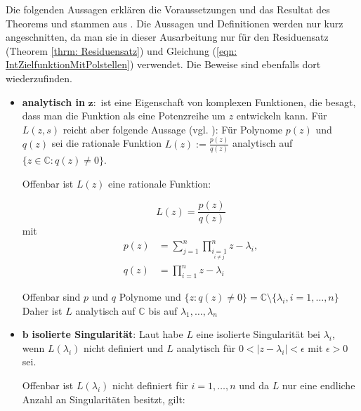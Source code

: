 \documentclass[a4paper,12pt]{report}
\newcommand{\C}{\mathbb C}
\newcommand{\1}{\mathds{1}}
\theoremstyle{plain} %
\theoremstyle{definition} %
\theoremstyle{remark}
\begin{document}
            Die folgenden Aussagen erklären die Voraussetzungen und das Resultat des Theorems und stammen aus \cite{complexAnalysis}.
            Die Aussagen und Definitionen werden nur kurz angeschnitten, da man sie in dieser Ausarbeitung nur für den Residuensatz (Theorem \ref{thrm: Residuensatz}) und Gleichung (\ref{eqn: IntZielfunktionMitPolstellen}) verwendet.
            Die Beweise sind ebenfalls dort wiederzufinden.
            \begin{itemize}
                  \item \textbf{analytisch in }$\mathbf{z:}$ ist eine Eigenschaft von komplexen Funktionen, die besagt, dass man die Funktion als eine Potenzreihe um $z$ entwickeln kann.
                        Für $L(z, s)$ reicht aber folgende Aussage (vgl. \cite[S. 24]{complexAnalysis}):
                        Für Polynome $p(z)$ und $q(z)$ sei die rationale Funktion $L(z):=\frac{p(z)}{q(z)}$ analytisch auf $\{z\in\C: q(z)\ne 0\}$.
                        
                        Offenbar ist $L(z)$ eine rationale Funktion:

                        $$L(z) = \frac{p(z)}{q(z)}$$
                        mit 
                        \begin{align*}
                              p(z) &= \sum_{j=1}^{n}\prod_{\underset{i\ne j}{i=1}}^{n} z-\lambda_i,\\
                              q(z) &= \prod_{i=1}^{n} z-\lambda_i
                        \end{align*}

                        Offenbar sind $p$ und $q$ Polynome und $\{z: q(z)\ne 0\} = \C\setminus\{\lambda_i, i=1,\dots,n\}$
                        Daher ist $L$ analytisch auf $\C$ bis auf $\lambda_1,\dots,\lambda_n$
                  \item $\mathbf{b}$\textbf{ isolierte Singularität}:
                        Laut \cite[S. 74]{complexAnalysis} habe $L$ eine isolierte Singularität bei $\lambda_i$, wenn $L(\lambda_i)$ nicht definiert und $L$ analytisch für $0<|z-\lambda_i|<\epsilon$ mit $\epsilon>0$ sei.

                        Offenbar ist $L(\lambda_i)$ nicht definiert für $i=1,\dots,n$ und da $L$ nur eine endliche Anzahl an Singularitäten besitzt, gilt:


\end{itemize}
\end{document}
